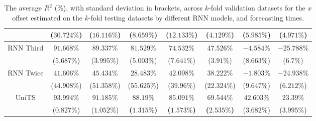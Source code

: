 \begin{table}[!ht]
{\begin{tabular}{|c|c|c|c|c|c|c|c|}
			 & ($30.724\%$) & ($16.116\%$) & ($8.659\%$) & ($12.133\%$) & ($4.129\%$) & ($5.985\%$) & ($4.971\%$) \\ \hline
			\multirow{2}{*}{RNN Third} & $91.668\%$ & $89.337\%$ & $81.529\%$ & $74.532\%$ & $47.526\%$ & $-4.584\%$ & $-25.788\%$ \\
			 & ($5.687\%$) & ($3.995\%$) & ($5.003\%$) & ($7.641\%$) & ($3.91\%$) & ($8.663\%$) & ($6.7\%$) \\ \hline
			\multirow{2}{*}{RNN Twice} & $41.606\%$ & $45.434\%$ & $28.483\%$ & $42.098\%$ & $38.222\%$ & $-1.803\%$ & $-24.938\%$ \\
			 & ($44.908\%$) & ($51.358\%$) & ($55.625\%$) & ($39.96\%$) & ($22.324\%$) & ($9.647\%$) & ($6.212\%$) \\ \hline
			\multirow{2}{*}{UniTS} & $93.994\%$ & $91.185\%$ & $\mathbf{88.19\%}$ & $\mathbf{85.091\%}$ & $\mathbf{69.544\%}$ & $42.603\%$ & $23.39\%$ \\
			 & ($0.827\%$) & ($1.052\%$) & \textbf{(}$\mathbf{1.315\%}$\textbf{)} & \textbf{(}$\mathbf{1.573\%}$\textbf{)} & \textbf{(}$\mathbf{2.535\%}$\textbf{)} & ($3.682\%$) & ($3.995\%$) \\ \hline
		\end{tabular}
	}
	\caption{The average $R^{2}$ (\%), with standard deviation in brackets, across $k$-fold validation datasets for the $x$ offset estimated on the $k$-fold testing datasets by different RNN models, and forecasting times.}
	\label{tab:all_longitude_no_abs_R2}
\end{table}